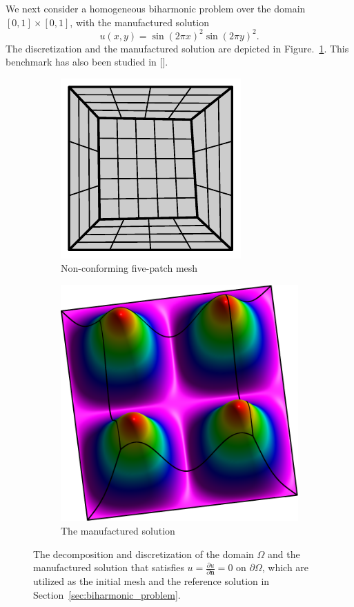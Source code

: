 We next consider a homogeneous biharmonic problem over the domain $\left[0, 1\right]\times \left[0, 1\right]$, with the manufactured solution
\begin{equation}
	u(x,y)=\sin(2\pi{x})^2\sin(2\pi{y})^2.
\end{equation}
The discretization and the manufactured solution are depicted in Figure.~\ref{fig:biharmonic_mesh}. This benchmark has also been studied in [].
\begin{figure}[ht]
	\center
	\begin{subfigure}[t]{.45\linewidth}
		\center
		\includegraphics[scale=1.35]{five_patches_mesh}
		\caption{Non-conforming five-patch mesh}
	\end{subfigure}
	\begin{subfigure}[t]{.45\linewidth}
		\center
		\includegraphics[scale=.425]{five_patch_solution-plot}
		\caption{The manufactured solution}
	\end{subfigure}
	\caption{The decomposition and discretization of the domain $\Omega$ and the manufactured solution that satisfies $u=\frac{\partial u}{\partial \mathbf{n}}=0$ on $\partial\Omega$, which are utilized as the initial mesh and the reference solution in Section~\ref{sec:biharmonic_problem}.}\label{fig:biharmonic_mesh}
\end{figure}

